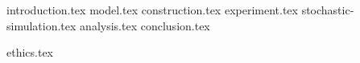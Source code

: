 {introduction.tex}
{model.tex}
{construction.tex}
{experiment.tex}
{stochastic-simulation.tex}
{analysis.tex}
{conclusion.tex}

{ethics.tex}